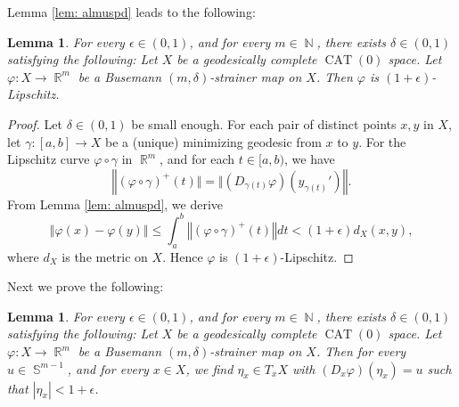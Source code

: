 \documentclass[a4paper,12pt]{amsart}
\newcommand{\CAT}{\operatorname{CAT}}
\newcommand{\R}{\operatorname{\mathbb{R}}}
\newcommand{\N}{\operatorname{\mathbb{N}}}
\newcommand{\Sph}{\operatorname{\mathbb{S}}}
\numberwithin{equation}{section}
\theoremstyle{plain}
\newtheorem{lem}[thm]{Lemma}
\theoremstyle{definition}
\theoremstyle{remark}
\begin{document}
Lemma \ref{lem: almuspd} leads to the following:

\begin{lem}\label{lem: str1elip}
For every $\epsilon \in (0,1)$, and for every $m \in \N$,
there exists $\delta \in (0,1)$ satisfying the following:
Let $X$ be a geodesically complete $\CAT(0)$ space.
Let $\varphi \colon X \to \R^m$
be a Busemann $(m,\delta)$-strainer map on $X$.
Then $\varphi$ is $(1+\epsilon)$-Lipschitz.
\end{lem}

\begin{proof}
Let $\delta \in (0,1)$ be small enough.
For each pair of distinct points $x, y$ in $X$,
let $\gamma \colon [a,b] \to X$ be 
a (unique) minimizing geodesic from $x$ to $y$.
For the Lipschitz curve $\varphi \circ \gamma$ in $\R^m$, 
and for each $t \in [a,b)$,
we have 
\[
\left\Vert \left( \varphi \circ \gamma \right)^+(t) \Vert 
= \Vert \left( D_{\gamma(t)}\varphi \right) \left( y_{\gamma(t)}' \right) \right\Vert.
\]
From Lemma \ref{lem: almuspd},
we derive
\[
\left\Vert \varphi(x) - \varphi(y) \right\Vert \le 
\int_a^b
\left\Vert \left( \varphi \circ \gamma \right)^+(t) \right\Vert dt
< \left( 1+\epsilon \right) d_X(x,y),
\]
where $d_X$ is the metric on $X$.
Hence $\varphi$ is $(1+\epsilon)$-Lipschitz.
\end{proof}

Next we prove the following:

\begin{lem}\label{lem: str1eopen}
For every $\epsilon \in (0,1)$, and for every $m \in \N$,
there exists $\delta \in (0,1)$ satisfying the following:
Let $X$ be a geodesically complete $\CAT(0)$ space.
Let $\varphi \colon X \to \R^m$
be a Busemann $(m,\delta)$-strainer map on $X$.
Then for every $u \in \Sph^{m-1}$,
and for every $x \in X$,
we find $\eta_x \in T_xX$ with 
$\left( D_x\varphi \right) \left( \eta_x \right) = u$
such that
$\left\vert \eta_x \right\vert < 1+\epsilon$.
\end{lem}
\end{document}
